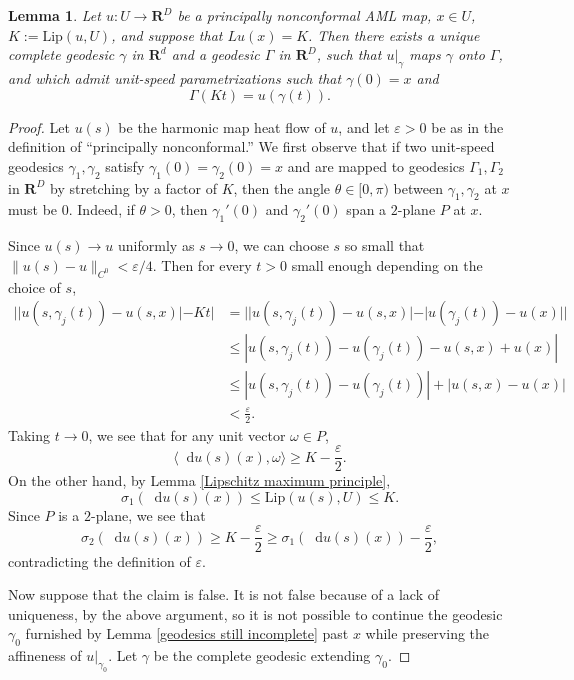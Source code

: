 \documentclass[reqno,11pt]{amsart}
\newcommand{\RR}{\mathbf{R}}
\newcommand*\dif{\mathop{}\!\mathrm{d}}
\newcommand{\Lip}{\mathrm{Lip}}
\newtheorem{lemma}[theorem]{Lemma}
\theoremstyle{definition}
\numberwithin{equation}{section}
\begin{document}
\begin{lemma}
Let $u: U \to \RR^D$ be a principally nonconformal AML map, $x \in U$, $K := \Lip(u, U)$, and suppose that $Lu(x) = K$.
Then there exists a unique complete geodesic $\gamma$ in $\RR^d$ and a geodesic $\Gamma$ in $\RR^D$, such that $u|_\gamma$ maps $\gamma$ onto $\Gamma$, and which admit unit-speed parametrizations such that $\gamma(0) = x$ and
$$\Gamma(Kt) = u(\gamma(t)).$$
\end{lemma}
\begin{proof}
Let $u(s)$ be the harmonic map heat flow of $u$, and let $\varepsilon > 0$ be as in the definition of ``principally nonconformal.''
We first observe that if two unit-speed geodesics $\gamma_1, \gamma_2$ satisfy $\gamma_1(0) = \gamma_2(0) = x$ and are mapped to geodesics $\Gamma_1, \Gamma_2$ in $\RR^D$ by stretching by a factor of $K$, then the angle $\theta \in [0, \pi)$ between $\gamma_1, \gamma_2$ at $x$ must be $0$.
Indeed, if $\theta > 0$, then $\gamma_1'(0)$ and $\gamma_2'(0)$ span a $2$-plane $P$ at $x$.

Since $u(s) \to u$ uniformly as $s \to 0$, we can choose $s$ so small that $\|u(s) - u\|_{C^0} < \varepsilon/4$.
Then for every $t > 0$ small enough depending on the choice of $s$,
\begin{align*}
||u(s, \gamma_j(t)) - u(s, x)| - Kt| 
&= ||u(s, \gamma_j(t)) - u(s, x)| - |u(\gamma_j(t)) - u(x)|| \\
&\leq |u(s, \gamma_j(t)) - u(\gamma_j(t)) - u(s, x) + u(x)| \\
&\leq |u(s, \gamma_j(t)) - u(\gamma_j(t))| + |u(s, x) - u(x)| \\
&< \frac{\varepsilon}{2}.
\end{align*}
Taking $t \to 0$, we see that for any unit vector $\omega \in P$,
$$\langle \dif u(s)(x), \omega\rangle \geq K - \frac{\varepsilon}{2}.$$
On the other hand, by Lemma \ref{Lipschitz maximum principle},
$$\sigma_1(\dif u(s)(x)) \leq \Lip(u(s), U) \leq K.$$
Since $P$ is a $2$-plane, we see that
$$\sigma_2(\dif u(s)(x)) \geq K - \frac{\varepsilon}{2} \geq \sigma_1(\dif u(s)(x)) - \frac{\varepsilon}{2},$$
contradicting the definition of $\varepsilon$.

Now suppose that the claim is false.
It is not false because of a lack of uniqueness, by the above argument, so it is not possible to continue the geodesic $\gamma_0$ furnished by Lemma \ref{geodesics still incomplete} past $x$ while preserving the affineness of $u|_{\gamma_0}$.
Let $\gamma$ be the complete geodesic extending $\gamma_0$.


\end{proof}
\end{document}
